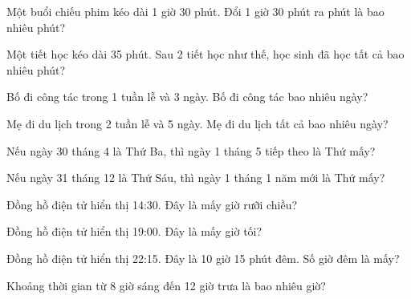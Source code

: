 \begin{ex}
Một buổi chiếu phim kéo dài 1 giờ 30 phút. Đổi 1 giờ 30 phút ra phút là bao nhiêu phút?
\end{ex}

\begin{ex}
Một tiết học kéo dài 35 phút. Sau 2 tiết học như thế, học sinh đã học tất cả bao nhiêu phút?
\end{ex}

\begin{ex}
Bố đi công tác trong 1 tuần lễ và 3 ngày. Bố đi công tác bao nhiêu ngày?
\end{ex}

\begin{ex}
Mẹ đi du lịch trong 2 tuần lễ và 5 ngày. Mẹ đi du lịch tất cả bao nhiêu ngày?
\end{ex}

\begin{ex}
Nếu ngày 30 tháng 4 là Thứ Ba, thì ngày 1 tháng 5 tiếp theo là Thứ mấy?
\end{ex}

\begin{ex}
Nếu ngày 31 tháng 12 là Thứ Sáu, thì ngày 1 tháng 1 năm mới là Thứ mấy?
\end{ex}

\begin{ex}
Đồng hồ điện tử hiển thị 14:30. Đây là mấy giờ rưỡi chiều?
\end{ex}

\begin{ex}
Đồng hồ điện tử hiển thị 19:00. Đây là mấy giờ tối?
\end{ex}

\begin{ex}
Đồng hồ điện tử hiển thị 22:15. Đây là 10 giờ 15 phút đêm. Số giờ đêm là mấy?
\end{ex}

\begin{ex}
Khoảng thời gian từ 8 giờ sáng đến 12 giờ trưa là bao nhiêu giờ?
\end{ex}

